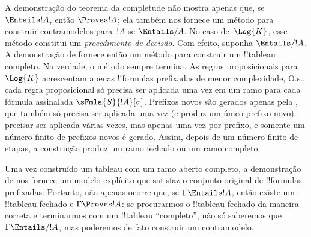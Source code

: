\documentclass[../../../include/open-logic-section]{subfiles}
\begin{document}
      

\begin{explain}
  A demonstração do teorema da completude não mostra apenas que, se
  $\Entails !A$, então $\Proves !A$; ela também nos fornece um método
  para construir contramodelos para~$!A$ se $\Entails/ A$. No caso
  de~$\Log{K}$, esse método constitui um \emph{procedimento de decisão}.
  Com efeito, suponha $\Entails/ !A$. A demonstração de
   fornece então um método para construir
  um !!{tableau} completo. Na verdade, o método sempre termina. As regras
  proposicionais para~$\Log{K}$ acrescentam apenas !!{formula}s prefixadas
  de menor complexidade, O.s.\@, cada regra proposicional só precisa ser
  aplicada uma vez em um ramo para cada fórmula assinalada
  $\sFmla{S}{!A}[\sigma]$. Prefixos novos são gerados apenas pela
  , que também só precisa
  ser aplicada uma vez (e produz um único prefixo novo).
   precisar ser aplicada
  várias vezes, mas apenas uma vez por prefixo, e somente um número finito
  de prefixos novos é gerado. Assim, depois de um número finito de etapas,
  a construção produz um ramo fechado ou um ramo completo.

  Uma vez construído um tableau com um ramo aberto completo, a demonstração
  de  nos fornece um modelo explícito
  que satisfaz o conjunto original de !!{formula}s prefixadas. Portanto,
  não apenas ocorre que, se $\Gamma \Entails !A$, então existe um
  !!{tableau} fechado e $\Gamma \Proves !A$: se procurarmos o !!{tableau}
  fechado da maneira correta e terminarmos com um !!{tableau} ``completo'',
  não só saberemos que $\Gamma \Entails/ !A$, mas poderemos de fato
  construir um contramodelo.
\end{explain}
\end{document}
